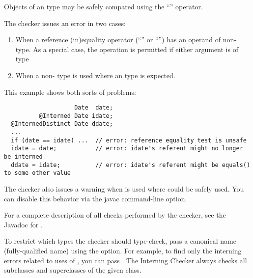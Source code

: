 Objects of an  type may be safely compared using the ``\code{==}''
operator.

The checker issues an error in two cases:

\begin{enumerate}

\item
  When a reference (in)equality operator (``\code{==}'' or ``\code{!=}'')
  has an operand of non- type.
  As a special case, the operation is permitted if either argument is of
   type

\item
  When a non- type is used
  where an  type
  is expected.

\end{enumerate}

This example shows both sorts of problems:

\begin{Verbatim}
                    Date  date;
          @Interned Date idate;
  @InternedDistinct Date ddate;
  ...
  if (date == idate) ...  // error: reference equality test is unsafe
  idate = date;           // error: idate's referent might no longer be interned
  ddate = idate;          // error: idate's referent might be equals() to some other value
\end{Verbatim}

\label{lint-dotequals}

The checker also issues a warning when  is used where
\code{==} could be safely used.  You can disable this behavior via the
javac  command-line option.

For a complete description of all checks performed by
  the checker, see the Javadoc for
  .

\label{checking-class}
To restrict which types the checker should type-check, pass a canonical
name (fully-qualified name) using the  option.
For example, to find only the
interning errors related to uses of , you can pass
.  The Interning Checker always checks all
subclasses and superclasses of the given class.



